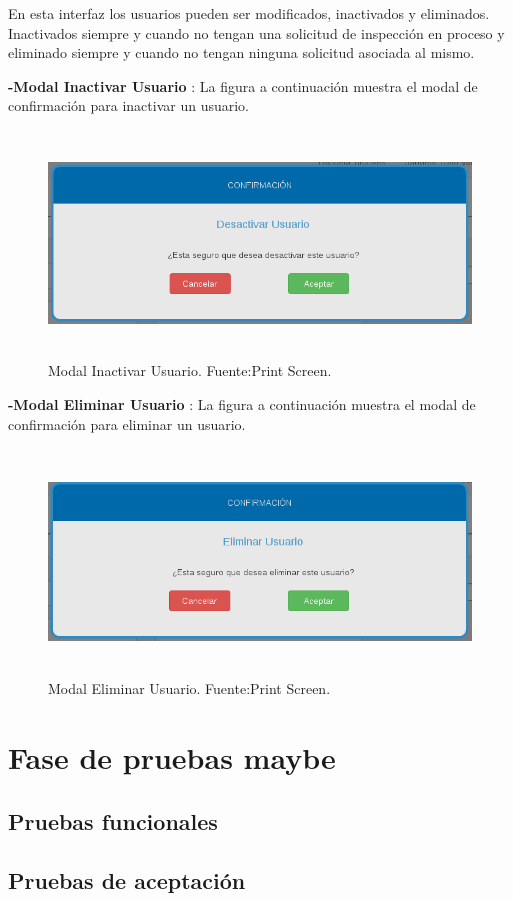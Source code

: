 En esta interfaz los usuarios pueden ser modificados, inactivados y eliminados. Inactivados siempre y cuando no tengan una solicitud de inspección en proceso y eliminado siempre y cuando no tengan ninguna solicitud asociada al mismo.


\textbf{-Modal Inactivar Usuario }: La figura a continuación muestra el modal de confirmación para inactivar un usuario.

\begin{figure}[H]
\begin{center}
	\includegraphics[width=14cm,height=6cm]{img/interfaces/modal_inactivar_usuario.png}
\end{center}
\caption{Modal Inactivar Usuario. Fuente:Print Screen.}
\label{fig:modal_confirmacion_inactivar_usuario}
\end{figure}

\textbf{-Modal Eliminar Usuario }: La figura a continuación muestra el modal de confirmación para eliminar un usuario.

\begin{figure}[H]
\begin{center}
	\includegraphics[width=14cm,height=6cm]{img/interfaces/modal_eliminar_usuario.png}
\end{center}
\caption{Modal Eliminar Usuario. Fuente:Print Screen.}
\label{fig:modal_confirmacion_eliminar_usuario}
\end{figure}





\setlength{\parskip}{0mm}




\section{Fase de pruebas maybe } 
\setlength{\parskip}{5mm}
\setlength{\parskip}{0mm}


\subsection{Pruebas funcionales}
\setlength{\parskip}{5mm}
\setlength{\parskip}{0mm}

\subsection{Pruebas de aceptación}
\setlength{\parskip}{5mm}
\setlength{\parskip}{0mm}
